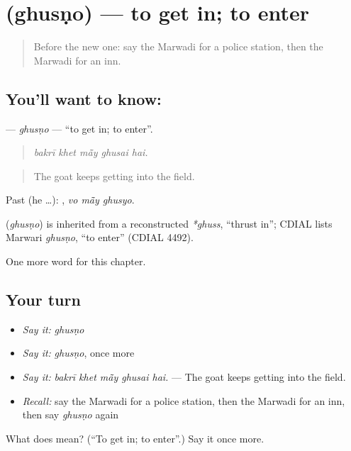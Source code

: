 \section[\texorpdfstring{\mw{घुसणो} (ghusṇo)}{घुसणो (ghusṇo)}]{ (ghusṇo) — to get in; to enter}

\label{lesson:MW-C201-ghusno}



\begin{quote}
Before the new one: say the Marwadi for a police station, then the Marwadi for an inn.
\end{quote}

\subsection*{You'll want to know: }
\textbf{} — \emph{ghusṇo} — \textquotedblleft{}to get in; to enter\textquotedblright{}.

\begin{quote}
    
\end{quote}

\begin{quote}
\emph{bakrī khet mā̃y ghusai hai.}
\end{quote}

\begin{quote}
The goat keeps getting into the field.
\end{quote}

Past (he …):   , \emph{vo mā̃y ghusyo}.

\begin{cousinweb}
\textbf{} (\emph{ghusṇo}) is inherited from a reconstructed \emph{*ghuss}, \textquotedblleft{}thrust in\textquotedblright{}; CDIAL lists Marwari \emph{ghusṇo}, \textquotedblleft{}to enter\textquotedblright{} (CDIAL 4492).
\end{cousinweb}

\begin{grammarlens}[title={What you've built}]
One more word for this chapter.
\end{grammarlens}

\subsection*{Your turn}
\begin{itemize}
\raggedright
  \item \emph{Say it:} \emph{ghusṇo}
  \item \emph{Say it:} \emph{ghusṇo}, once more
  \item \emph{Say it:} \emph{bakrī khet mā̃y ghusai hai.} — The goat keeps getting into the field.
  \item \emph{Recall:} say the Marwadi for a police station, then the Marwadi for an inn, then say \emph{ghusṇo} again
\end{itemize}

\begin{tcolorbox}[breakable,colback=teal!4,colframe=teal!35!black,title={Before you move on}]
What does  mean? (\textquotedblleft{}To get in; to enter\textquotedblright{}.) Say it once more.
\end{tcolorbox}

